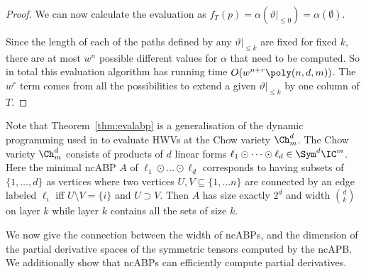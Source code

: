 \begin{proof}
We can now calculate the evaluation as $
    f_T(p) = \alpha(\vartheta|_{\leq 0}) = \alpha(\emptyset).
$

Since the length of each of the paths defined by any $\vartheta|_{\leq k}$ are fixed for fixed $k$, there are at most $w^n$ possible different values for $\alpha$ that need to be computed.
So in total this evaluation algorithm has running time $O(w^{n+r} \poly(n,d,m))$.
The $w^{r}$ term comes from all the possibilities to extend a given $\vartheta|_{\leq k}$ by one column of $T$.
\end{proof}

\begin{remark}
    Note that Theorem~\ref{thm:evalabp} is a generalisation of the dynamic programming used in \cite{DBLP:conf/icalp/DorflerIP19} to evaluate HWVs at the Chow variety $\Ch^d_m$.
    The Chow variety $\Ch^d_m$ consists of products of $d$ linear forms $\ell_1 \odot \dots \odot \ell_d \in \Sym^d \IC^m$.
    Here the minimal ncABP $A$ of $\ell_1 \odot \dots \odot \ell_d$ corresponds to having subsets of $\{1, \ldots, d\}$ as vertices where two vertices $U, V \subseteq \{1, \ldots n\}$ are connected by an edge labeled $\ell_i$ iff $U \setminus V = \{i\}$ and $U \supset V$.
    Then $A$ has size exactly $2^d$ and width $\binom{d}{k}$ on layer $k$ while layer $k$ contains all the sets of size $k$.
\end{remark}

We now give the connection between the width of ncABPs, and the dimension of the partial derivative spaces of the symmetric tensors computed by the ncAPB.
We additionally show that ncABPs can efficiently compute partial derivatives.

